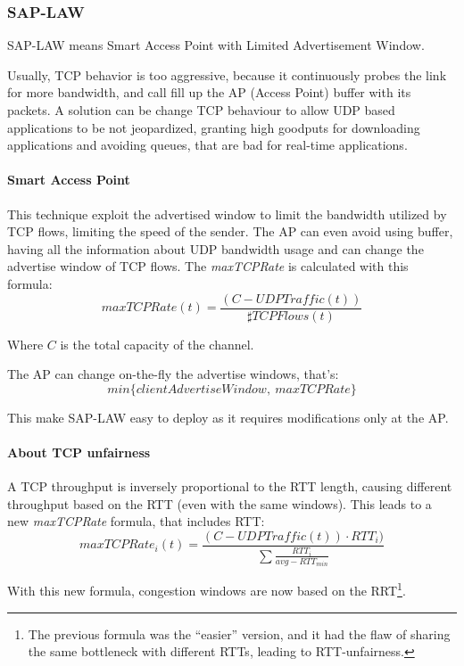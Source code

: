 \subsubsection{SAP-LAW}

SAP-LAW means Smart Access Point with Limited Advertisement Window.

Usually, TCP behavior is too aggressive, because it continuously probes the link
for more bandwidth, and call fill up the AP (Access Point) buffer with its
packets. A solution can be change TCP behaviour to allow UDP based applications
to be not jeopardized, granting high goodputs for downloading applications and
avoiding queues, that are bad for real-time applications.

\paragraph*{Smart Access Point} This technique exploit the advertised window to
limit the bandwidth utilized by TCP flows, limiting the speed of the sender. The
AP can even avoid using buffer, having all the information about UDP bandwidth
usage and can change the advertise window of TCP flows. The \textit{maxTCPRate}
is calculated with this formula:
\begin{equation}
  maxTCPRate(t) = \frac{(C - UDPTraffic(t))}{\sharp TCPFlows(t)}
\end{equation}

Where $C$ is the total capacity of the channel.

The AP can change on-the-fly the advertise windows, that's:
\begin{equation*}
  min \{clientAdvertiseWindow,\ maxTCPRate \}
\end{equation*}

This make SAP-LAW easy to deploy as it requires modifications only at the AP.

\paragraph*{About TCP unfairness} A TCP throughput is inversely proportional to
the RTT length, causing different throughput based on the RTT (even with the
same windows). This leads to a new \textit{maxTCPRate} formula, that includes
RTT:
\begin{equation}
maxTCPRate_{i}(t) = \frac{(C - UDPTraffic(t)) \cdot RTT_i)}{\sum
\frac{RTT_i}{avg - RTT_{min}}}
\end{equation}

With this new formula, congestion windows are now based on the RRT\footnote{
  The previous formula was the ``easier'' version, and it had the flaw of
sharing the same bottleneck with different RTTs, leading to RTT-unfairness.
}.

